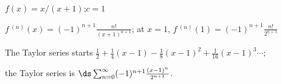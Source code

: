 {$f(x) = x/(x+1)$;\quad $c=1$
}
{$f\,^{(n)}(x) = (-1)^{n+1}\frac{n!}{(x+1)^{n+1}}$; at $x=1$, $f\,^{(n)}(1)=(-1)^{n+1}\frac{n!}{2^{n+1}}$

The Taylor series starts $\frac12+\frac14(x-1)-\frac18(x-1)^2+\frac1{16}(x-1)^3\cdots$; 

the Taylor series is $\ds \sum_{n=0}^\infty (-1)^{n+1}\frac{(x-1)^n}{2^{n+1}}$.
}